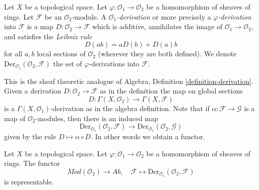 \begin{definition}
\label{definition-derivation}
Let $X$ be a topological space. Let $\varphi : \mathcal{O}_1 \to \mathcal{O}_2$
be a homomorphism of sheaves of rings. Let $\mathcal{F}$ be an
$\mathcal{O}_2$-module. A {\it $\mathcal{O}_1$-derivation} or more precisely
a {\it $\varphi$-derivation} into $\mathcal{F}$ is a map
$D : \mathcal{O}_2 \to \mathcal{F}$ which is additive, annihilates the image
of $\mathcal{O}_1 \to \mathcal{O}_2$, and satisfies the
{\it Leibniz rule}
$$
D(ab) = aD(b) + D(a)b
$$
for all $a, b$ local sections of $\mathcal{O}_2$ (wherever they are both
defined). We denote $\text{Der}_{\mathcal{O}_1}(\mathcal{O}_2, \mathcal{F})$
the set of $\varphi$-derivations into $\mathcal{F}$.
\end{definition}

\noindent
This is the sheaf theoretic analogue of
Algebra, Definition \ref{definition-derivation}.
Given a derivation $D : \mathcal{O}_2 \to \mathcal{F}$
as in the definition the map on global sections
$$
D : \Gamma(X, \mathcal{O}_2) \longrightarrow \Gamma(X, \mathcal{F})
$$
is a $\Gamma(X, \mathcal{O}_1)$-derivation as in the algebra definition.
Note that if $\alpha : \mathcal{F} \to \mathcal{G}$ is a map of
$\mathcal{O}_2$-modules, then there is an induced map
$$
\text{Der}_{\mathcal{O}_1}(\mathcal{O}_2, \mathcal{F})
\longrightarrow
\text{Der}_{\mathcal{O}_1}(\mathcal{O}_2, \mathcal{G})
$$
given by the rule $D \mapsto \alpha \circ D$. In other words
we obtain a functor.

\begin{lemma}
\label{lemma-universal-module}
Let $X$ be a topological space. Let $\varphi : \mathcal{O}_1 \to \mathcal{O}_2$
be a homomorphism of sheaves of rings. The functor
$$
\textit{Mod}(\mathcal{O}_2) \longrightarrow \textit{Ab}, \quad
\mathcal{F} \longmapsto \text{Der}_{\mathcal{O}_1}(\mathcal{O}_2, \mathcal{F})
$$
is representable.
\end{lemma}


